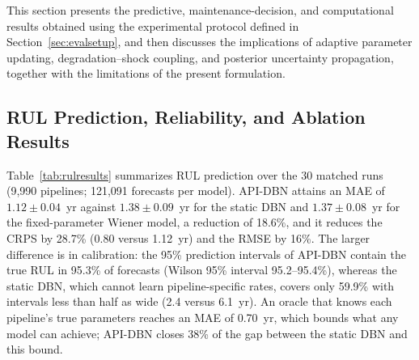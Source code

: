 \documentclass[journal]{IEEEtran}
\begin{document}
This section presents the predictive, maintenance-decision, and
computational results obtained using the experimental protocol defined
in Section~\ref{sec:evalsetup}, and then discusses the implications of
adaptive parameter updating, degradation--shock coupling, and posterior
uncertainty propagation, together with the limitations of the present
formulation.



\subsection{RUL Prediction, Reliability, and Ablation Results}
\label{sec:rulresults}

Table~\ref{tab:rulresults} summarizes RUL prediction over the 30
matched runs (9{,}990 pipelines; 121{,}091 forecasts per model).
API-DBN attains an MAE of $1.12\pm0.04$~yr against $1.38\pm0.09$~yr
for the static DBN and $1.37\pm0.08$~yr for the fixed-parameter Wiener
model, a reduction of 18.6\%, and it reduces the CRPS by 28.7\% (0.80
versus 1.12~yr) and the RMSE by 16\%. The larger difference is in
calibration: the 95\% prediction intervals of API-DBN contain the true
RUL in 95.3\% of forecasts (Wilson 95\% interval 95.2--95.4\%), whereas
the static DBN, which cannot learn pipeline-specific rates, covers only
59.9\% with intervals less than half as wide (2.4 versus 6.1~yr). An
oracle that knows each pipeline's true parameters reaches an MAE of
0.70~yr, which bounds what any model can achieve; API-DBN closes 38\%
of the gap between the static DBN and this bound.

\begin{table}[t]
\centering
\caption{RUL Prediction Performance (Mean $\pm$ Std.\ over 30 Runs)}
\label{tab:rulresults}
\end{table}
\end{document}
